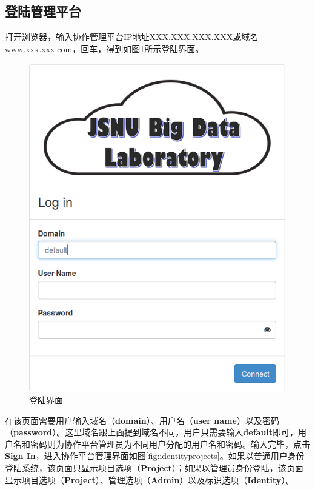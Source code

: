 \documentclass[12pt]{ctexart}%
\begin{document}
\subsection{登陆管理平台}
打开浏览器，输入协作管理平台IP地址XXX.XXX.XXX.XXX或域名www.xxx.xxx.com，回车，得到如图\ref{fig:login}所示登陆界面。

\begin{figure}[!htb]
\centering
\includegraphics[width=5in]{./figures/login}
\caption{登陆界面}
\label{fig:login}
\end{figure}
在该页面需要用户输入域名（\textbf{domain}）、用户名（\textbf{user name}）以及密码（\textbf{password}）。这里域名跟上面提到域名不同，用户只需要输入\textbf{default}即可，用户名和密码则为协作平台管理员为不同用户分配的用户名和密码。输入完毕，点击\textbf{Sign In}，进入协作平台管理界面如图\ref{fig:identityprojects}。如果以普通用户身份登陆系统，该页面只显示项目选项（\textbf{Project}）；如果以管理员身份登陆，该页面显示项目选项（\textbf{Project}）、管理选项（\textbf{Admin}）以及标识选项（\textbf{Identity}）。
\end{document}
